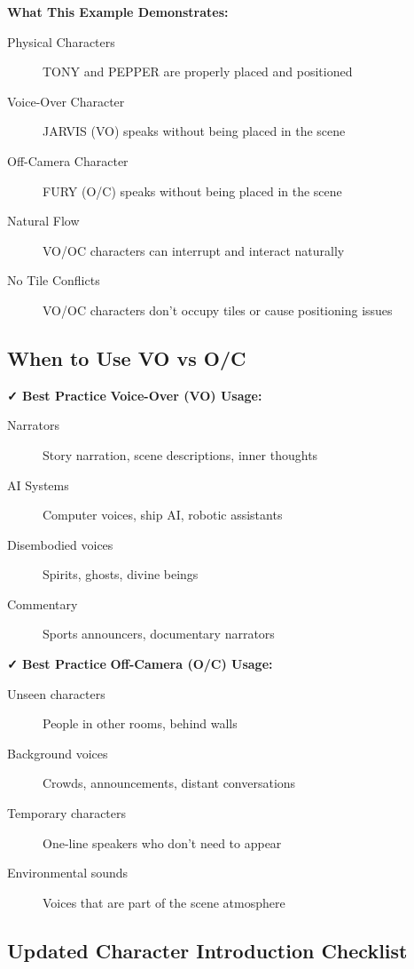 \documentclass[11pt,letterpaper,oldstylefigures]{memoir}
\begin{document}
\textbf{What This Example Demonstrates:}

\begin{description}
\item[Physical Characters] TONY and PEPPER are properly placed and positioned
\item[Voice-Over Character] JARVIS (VO) speaks without being placed in the scene
\item[Off-Camera Character] FURY (O/C) speaks without being placed in the scene
\item[Natural Flow] VO/OC characters can interrupt and interact naturally
\item[No Tile Conflicts] VO/OC characters don't occupy tiles or cause positioning issues
\end{description}

\subsection{When to Use VO vs O/C}

\textbf{✓ Best Practice}
\textbf{Voice-Over (VO) Usage:}
\begin{description}
\item[Narrators] Story narration, scene descriptions, inner thoughts
\item[AI Systems] Computer voices, ship AI, robotic assistants
\item[Disembodied voices] Spirits, ghosts, divine beings
\item[Commentary] Sports announcers, documentary narrators
\end{description}

\textbf{✓ Best Practice}
\textbf{Off-Camera (O/C) Usage:}
\begin{description}
\item[Unseen characters] People in other rooms, behind walls
\item[Background voices] Crowds, announcements, distant conversations
\item[Temporary characters] One-line speakers who don't need to appear
\item[Environmental sounds] Voices that are part of the scene atmosphere
\end{description}


\subsection{Updated Character Introduction Checklist}
\end{document}
